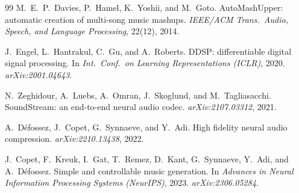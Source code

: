 \documentclass[11pt]{article}
\begin{document}
{\begin{thebibliography}{99}
M.~E.~P.~Davies, P.~Hamel, K.~Yoshii, and M.~Goto.
\newblock AutoMashUpper: automatic creation of multi-song music mashups.
\newblock \emph{IEEE/ACM Trans.\ Audio, Speech, and Language Processing},
  22(12), 2014.

J.~Engel, L.~Hantrakul, C.~Gu, and A.~Roberts.
\newblock DDSP: differentiable digital signal processing.
\newblock In \emph{Int.\ Conf.\ on Learning Representations (ICLR)}, 2020.
  \emph{arXiv:2001.04643}.

N.~Zeghidour, A.~Luebs, A.~Omran, J.~Skoglund, and M.~Tagliasacchi.
\newblock SoundStream: an end-to-end neural audio codec.
\newblock \emph{arXiv:2107.03312}, 2021.

A.~D\'efossez, J.~Copet, G.~Synnaeve, and Y.~Adi.
\newblock High fidelity neural audio compression.
\newblock \emph{arXiv:2210.13438}, 2022.

J.~Copet, F.~Kreuk, I.~Gat, T.~Remez, D.~Kant, G.~Synnaeve, Y.~Adi, and
  A.~D\'efossez.
\newblock Simple and controllable music generation.
\newblock In \emph{Advances in Neural Information Processing Systems (NeurIPS)},
  2023. \emph{arXiv:2306.05284}.

\end{thebibliography}
}
\end{document}
